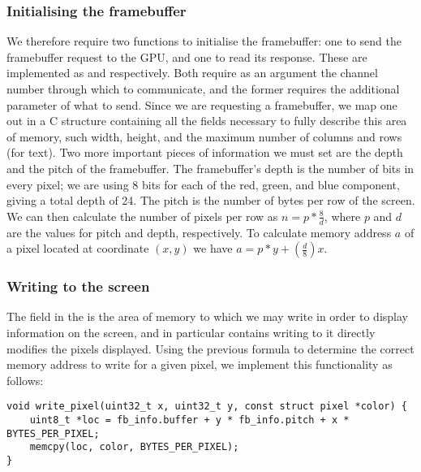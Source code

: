     \subsubsection{Initialising the framebuffer}
        We therefore require two functions to initialise the framebuffer: one to
        send the framebuffer request to the GPU, and one to read its response.
        These are implemented as  and
         respectively. Both require as an argument the
        channel number through which to communicate, and the former requires the
        additional parameter of what to send. Since we are requesting a
        framebuffer, we map one out in a C structure containing all the fields
        necessary to fully describe this area of memory, such width, height, and
        the maximum number of columns and rows (for text). Two more important
        pieces of information we must set are the depth and the pitch of the
        framebuffer. The framebuffer's depth is the number of bits in every
        pixel; we are using 8 bits for each of the red, green, and blue
        component, giving a total depth of 24. The pitch is the number of bytes
        per row of the screen. We can then calculate the number of pixels per
        row as $n = p * \frac{8}{d}$, where $p$ and $d$ are the values for pitch
        and depth, respectively. To calculate memory address $a$ of a pixel located
        at coordinate $(x,y)$ we have $a = p * y + (\frac{d}{8}) x$.

    \subsubsection{Writing to the screen}
        The field  in the  is the area of
        memory to which we may write in order to display information on the
        screen, and in particular contains writing to it directly modifies the
        pixels displayed. Using the previous formula to determine the correct
        memory address to write for a given pixel, we implement this
        functionality as follows:

        \lstset{language=c}
        \begin{lstlisting}[caption={Implementation of \code{write\_pixel}},captionpos=b]
void write_pixel(uint32_t x, uint32_t y, const struct pixel *color) {
    uint8_t *loc = fb_info.buffer + y * fb_info.pitch + x * BYTES_PER_PIXEL;
    memcpy(loc, color, BYTES_PER_PIXEL);
}
        \end{lstlisting}

